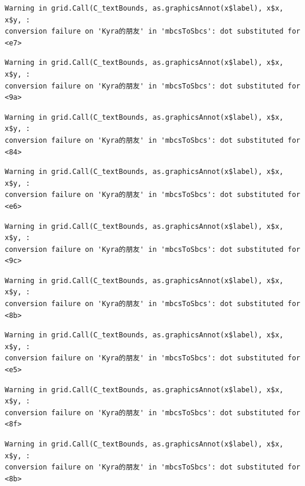 \documentclass[
  letterpaper,
  DIV=11,
  numbers=noendperiod]{scrreprt}
\begin{document}
\begin{verbatim}
Warning in grid.Call(C_textBounds, as.graphicsAnnot(x$label), x$x, x$y, :
conversion failure on 'Kyra的朋友' in 'mbcsToSbcs': dot substituted for <e7>
\end{verbatim}

\begin{verbatim}
Warning in grid.Call(C_textBounds, as.graphicsAnnot(x$label), x$x, x$y, :
conversion failure on 'Kyra的朋友' in 'mbcsToSbcs': dot substituted for <9a>
\end{verbatim}

\begin{verbatim}
Warning in grid.Call(C_textBounds, as.graphicsAnnot(x$label), x$x, x$y, :
conversion failure on 'Kyra的朋友' in 'mbcsToSbcs': dot substituted for <84>
\end{verbatim}

\begin{verbatim}
Warning in grid.Call(C_textBounds, as.graphicsAnnot(x$label), x$x, x$y, :
conversion failure on 'Kyra的朋友' in 'mbcsToSbcs': dot substituted for <e6>
\end{verbatim}

\begin{verbatim}
Warning in grid.Call(C_textBounds, as.graphicsAnnot(x$label), x$x, x$y, :
conversion failure on 'Kyra的朋友' in 'mbcsToSbcs': dot substituted for <9c>
\end{verbatim}

\begin{verbatim}
Warning in grid.Call(C_textBounds, as.graphicsAnnot(x$label), x$x, x$y, :
conversion failure on 'Kyra的朋友' in 'mbcsToSbcs': dot substituted for <8b>
\end{verbatim}

\begin{verbatim}
Warning in grid.Call(C_textBounds, as.graphicsAnnot(x$label), x$x, x$y, :
conversion failure on 'Kyra的朋友' in 'mbcsToSbcs': dot substituted for <e5>
\end{verbatim}

\begin{verbatim}
Warning in grid.Call(C_textBounds, as.graphicsAnnot(x$label), x$x, x$y, :
conversion failure on 'Kyra的朋友' in 'mbcsToSbcs': dot substituted for <8f>
\end{verbatim}

\begin{verbatim}
Warning in grid.Call(C_textBounds, as.graphicsAnnot(x$label), x$x, x$y, :
conversion failure on 'Kyra的朋友' in 'mbcsToSbcs': dot substituted for <8b>
\end{verbatim}
\end{document}
